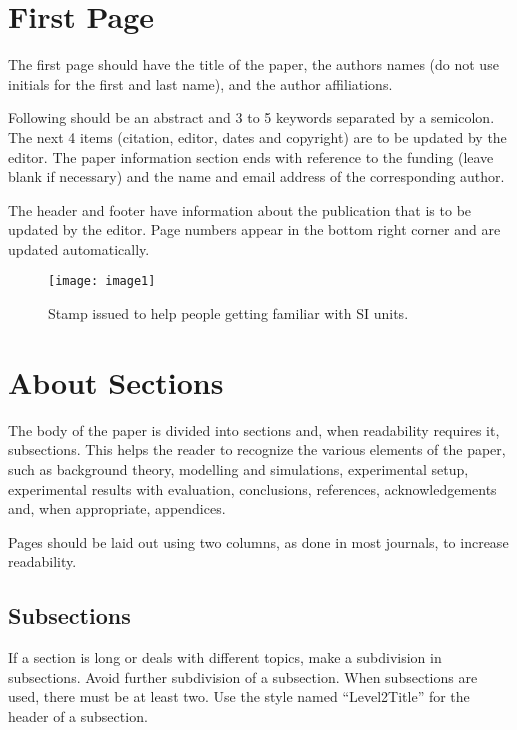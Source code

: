 \documentclass[final]{imeko_acta}
\begin{document}
\section{First Page}

The first page should have the title of the paper, the authors names (do not use initials for the first and last name), and the author affiliations.

Following should be an abstract and 3 to 5 keywords separated by a semicolon. The next 4 items (citation, editor, dates and copyright) are to be updated by the editor. The paper information section ends with reference to the funding (leave blank if necessary) and the name and email address of the corresponding author. 
\clearpage

The header and footer have information about the publication that is to be updated by the editor. Page numbers appear in the bottom right corner and are updated automatically. 

\begin{figure}[t]
	\centering
	\texttt{[image: image1]}
	\caption{Stamp issued to help people getting familiar with SI units.}
	\label{fig:image1}
\end{figure}

\section{About Sections}

The body of the paper is divided into sections and, when readability requires it, subsections. This helps the reader to recognize the various elements of the paper, such as background theory, modelling and simulations, experimental setup, experimental results with evaluation, conclusions, references, acknowledgements and, when appropriate, appendices. 

Pages should be laid out using two columns, as done in most journals, to increase readability.

\subsection{Subsections} \label{sec:sub1}

If a section is long or deals with different topics, make a subdivision in subsections. Avoid further subdivision of a subsection. When subsections are used, there must be at least two. Use the style named ``Level2Title'' for the header of a subsection.
\end{document}
